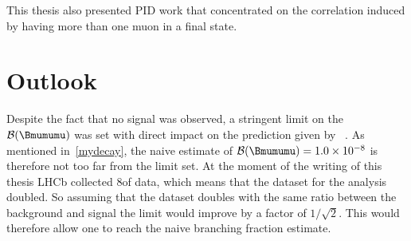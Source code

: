This thesis also presented \gls{PID} work that concentrated on the correlation induced by having more than one muon in a final state.


\section{Outlook}
Despite the fact that no signal was observed, a stringent limit on the $\mathcal{B}(\Bmumumu)$ was set with direct impact on the prediction given by ~\cite{Danilina:2018uzr}. As mentioned in~\autoref{mydecay}, the naive estimate of $\mathcal{B}(\Bmumumu)=1.0\times 10^{-8}$ is therefore not too far from the limit set. At the moment of the writing of this thesis \gls{LHCb} collected 8\invfb of data, which means that the dataset for the analysis doubled. So assuming that the dataset doubles with the same ratio between the background and signal the limit would improve by a factor of $1/\sqrt{2}$. This would therefore allow one to reach the naive branching fraction estimate. 



